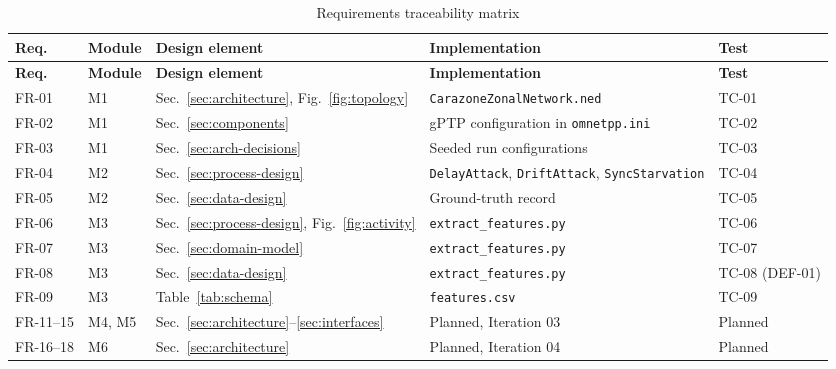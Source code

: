 \begin{longtable}{p{} p{} p{} p{} p{}}
\caption{Requirements traceability matrix}\label{tab:traceability}\\
\toprule
\textbf{Req.} & \textbf{Module} & \textbf{Design element} & \textbf{Implementation} & \textbf{Test} \\
\midrule
\endfirsthead
\toprule
\textbf{Req.} & \textbf{Module} & \textbf{Design element} & \textbf{Implementation} & \textbf{Test} \\
\midrule
\endhead
FR-01 & M1 & Sec.~\ref{sec:architecture}, Fig.~\ref{fig:topology} & \texttt{Carazone\allowbreak Zonal\allowbreak Network.ned} & TC-01 \\
FR-02 & M1 & Sec.~\ref{sec:components} & gPTP configuration in \texttt{omnetpp.ini} & TC-02 \\
FR-03 & M1 & Sec.~\ref{sec:arch-decisions} & Seeded run configurations & TC-03 \\
FR-04 & M2 & Sec.~\ref{sec:process-design} & \texttt{DelayAttack}, \texttt{DriftAttack}, \texttt{SyncStarvation} & TC-04 \\
FR-05 & M2 & Sec.~\ref{sec:data-design} & Ground-truth record & TC-05 \\
FR-06 & M3 & Sec.~\ref{sec:process-design}, Fig.~\ref{fig:activity} & \texttt{extract\_\allowbreak features.py} & TC-06 \\
FR-07 & M3 & Sec.~\ref{sec:domain-model} & \texttt{extract\_\allowbreak features.py} & TC-07 \\
FR-08 & M3 & Sec.~\ref{sec:data-design} & \texttt{extract\_\allowbreak features.py} & TC-08 (DEF-01) \\
FR-09 & M3 & Table~\ref{tab:schema} & \texttt{features.csv} & TC-09 \\
FR-11--15 & M4, M5 & Sec.~\ref{sec:architecture}--\ref{sec:interfaces} & Planned, Iteration 03 & Planned \\
FR-16--18 & M6 & Sec.~\ref{sec:architecture} & Planned, Iteration 04 & Planned \\
\bottomrule
\end{longtable}

